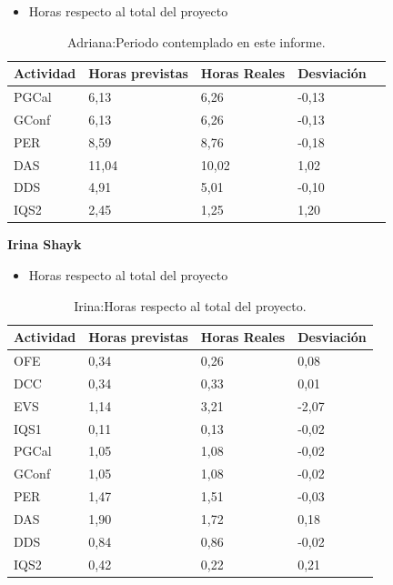 \begin{itemize}
\item Horas respecto al total del proyecto
\end{itemize}
\begin{table}[H]
\begin{center}
\begin{tabular}{ l l l l l }
  Actividad & Horas previstas & Horas Reales & Desviación \\ \hline \hline
PGCal	&	6,13	&	6,26	&	-0,13	\\ \hline
GConf	&	6,13	&	6,26	&	-0,13	\\ \hline
PER	&	8,59	&	8,76	&	-0,18	\\ \hline
DAS	&	11,04	&	10,02	&	1,02	\\ \hline
DDS	&	4,91	&	5,01	&	-0,10	\\ \hline
IQS2	&	2,45	&	1,25	&	1,20	\\ \hline
\end{tabular}
\caption{Adriana:Periodo contemplado en este informe.}
\label{tab:Adriana:PeriodoContempladoInforme_2}
\end{center}
\end{table}


\newpage


\textbf{Irina Shayk}
\begin{itemize}
\item Horas respecto al total del proyecto
\end{itemize}
\begin{table}[H]
\begin{center}
\begin{tabular}{ l l l l }
	Actividad & Horas previstas & Horas Reales & Desviación \\ \hline \hline
OFE	&	0,34	&	0,26	&	0,08	\\ \hline
DCC	&	0,34	&	0,33	&	0,01	\\ \hline
EVS	&	1,14	&	3,21	&	-2,07	\\ \hline
IQS1	&	0,11	&	0,13	&	-0,02	\\ \hline
PGCal	&	1,05	&	1,08	&	-0,02	\\ \hline
GConf	&	1,05	&	1,08	&	-0,02	\\ \hline
PER	&	1,47	&	1,51	&	-0,03	\\ \hline
DAS	&	1,90	&	1,72	&	0,18	\\ \hline
DDS	&	0,84	&	0,86	&	-0,02	\\ \hline
IQS2	&	0,42	&	0,22	&	0,21	\\ \hline
\end{tabular}
\caption{Irina:Horas respecto al total del proyecto.}
\label{tab:Irina:HorasTotalInforme_2}
\end{center}
\end{table}

